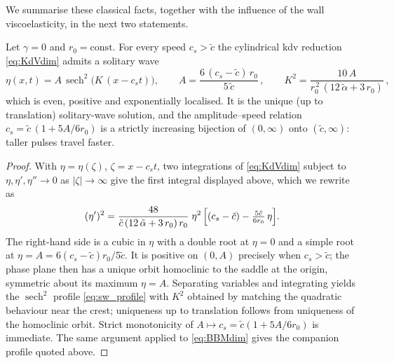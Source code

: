 \documentclass[alpha-refs, 12pt]{wiley-article}
\DeclareMathOperator{\sech}{sech}
\begin{document}
We summarise these classical facts, together with the influence of the wall viscoelasticity, in the next two statements.

\begin{proposition}\label{prop:solitary}
Let $\gamma=0$ and $r_{0}=\mathrm{const}$. For every speed $c_{s}>\tilde{c}$ the cylindrical \acrshort{kdv} reduction \eqref{eq:KdVdim} admits a solitary wave
\begin{equation}\label{eq:sw_profile}
  \eta(x,t)=A\,\sech^{2}\!\bigl(K\,(x-c_{s}t)\bigr),\qquad
  A=\frac{6\,(c_{s}-\tilde{c})\,r_{0}}{5\,\tilde{c}}\,,\qquad
  K^{2}=\frac{10\,A}{r_{0}^{\,2}\,(12\,\tilde{\alpha}+3\,r_{0})}\,,
\end{equation}
which is even, positive and exponentially localised. It is the unique (up to translation) solitary-wave solution, and the amplitude--speed relation $c_{s}=\tilde{c}\,(1+5A/6r_{0})$ is a strictly increasing bijection of $(0,\infty)$ onto $(\tilde{c},\infty)$: taller pulses travel faster.
\end{proposition}
\begin{proof}
With $\eta=\eta(\zeta)$, $\zeta=x-c_{s}t$, two integrations of \eqref{eq:KdVdim} subject to $\eta,\eta',\eta''\to0$ as $|\zeta|\to\infty$ give the first integral displayed above, which we rewrite as
\begin{equation*}
  (\eta')^{2}=\frac{48}{\tilde{c}\,(12\,\tilde{\alpha}+3\,r_{0})\,r_{0}}\;\eta^{2}\,\Bigl[(c_{s}-\tilde{c})-\tfrac{5\tilde{c}}{6r_{0}}\,\eta\Bigr].
\end{equation*}
The right-hand side is a cubic in $\eta$ with a double root at $\eta=0$ and a simple root at $\eta=A=6(c_{s}-\tilde{c})r_{0}/5\tilde{c}$. It is positive on $(0,A)$ precisely when $c_{s}>\tilde{c}$; the phase plane then has a unique orbit homoclinic to the saddle at the origin, symmetric about its maximum $\eta=A$. Separating variables and integrating yields the $\sech^{2}$ profile \eqref{eq:sw_profile} with $K^{2}$ obtained by matching the quadratic behaviour near the crest; uniqueness up to translation follows from uniqueness of the homoclinic orbit. Strict monotonicity of $A\mapsto c_{s}=\tilde{c}(1+5A/6r_{0})$ is immediate. The same argument applied to \eqref{eq:BBMdim} gives the companion profile quoted above.
\end{proof}
\end{document}

